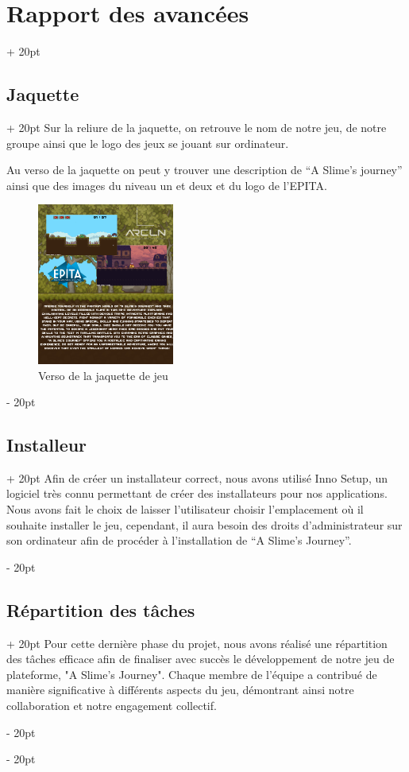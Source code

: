 \documentclass[a4paper, 12pt, twoside]{article}
\newcommand{\ind}[1][20pt]{\advance\leftskip + #1}
\newcommand{\deind}[1][20pt]{\advance\leftskip - #1}
\newenvironment{indt}[2][20pt]{#2 \par \ind[#1]}{\par \deind} %
\begin{document}
\begin{indt}{\section{Rapport des avancées}}
\begin{indt}{\subsection{Jaquette}}
            Sur la reliure de la jaquette, on retrouve le nom de notre jeu, de notre groupe ainsi que le logo des jeux se jouant sur ordinateur.

            Au verso de la jaquette on peut y trouver une description de “A Slime’s journey” ainsi que des images du niveau un et deux et du logo de l’EPITA.

            \begin{figure}[h]
                \centering
                \includegraphics[width=0.4\textwidth]{Jaquette3.png}
                \caption{Verso de la jaquette de jeu}
                \label{fig:mesh1}
            \end{figure}
        \end{indt}

        \newpage

        \begin{indt}{\subsection{Installeur}}
            Afin de créer un installateur correct, nous avons utilisé Inno Setup, un logiciel très connu permettant de créer des installateurs pour nos applications. Nous avons fait le choix de laisser l’utilisateur choisir l’emplacement où il souhaite installer le jeu, cependant, il aura besoin des droits d’administrateur sur son ordinateur afin de procéder à l’installation de “A Slime’s Journey”.
        \end{indt}

        \begin{indt}{\subsection{Répartition des tâches}}
            Pour cette dernière phase du projet, nous avons réalisé une répartition des tâches efficace afin de finaliser avec succès le développement de notre jeu de plateforme, "A Slime's Journey". Chaque membre de l'équipe a contribué de manière significative à différents aspects du jeu, démontrant ainsi notre collaboration et notre engagement collectif.


\end{indt}
\end{indt}
\end{document}
